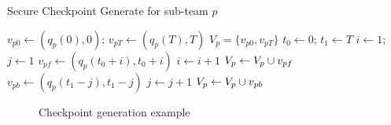 \documentclass[journal]{IEEEtran}  %
\begin{document}
\begin{algorithm}
  \caption{Secure Checkpoint Generate for sub-team $p$}\label{alg:checkpoint-gen}
  \begin{algorithmic}
  \State $v_{p0} \gets (q_{p}(0),0)$; $v_{pT} \gets (q_{p}(T),T)$
  \State $V_p = \{v_{p0}, v_{pT}\}$
  \State $t_0 \gets 0$; $t_1 \gets T$
    \State $i \gets 1$; $j\gets 1$
      \State $v_{pf} \gets (q_{p}(t_0+i),t_0+i)$
      \State $i \gets i+1$
    \EndWhile
    \State $V_p\gets V_p\cup v_{pf}$
    \State $v_{pb} \gets (q_{p}(t_1-j),t_1-j)$
    \State $j \gets j+1$
    \EndWhile
    \State $V_p\gets V_p\cup v_{pb}$
    \EndIf
  \EndWhile
  \end{algorithmic}
  \end{algorithm}

\begin{figure}
	\centering
    \caption{Checkpoint generation example}\label{fig:checkpoint-generate}
\end{figure}
\end{document}
